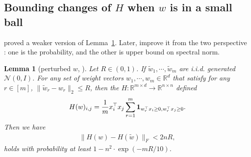 \documentclass[11pt]{article}
\newcommand{\N}{\mathcal{N}}
\newcommand{\wt}{\widetilde}
\newcommand{\R}{\mathbb{R}}
\newtheorem{lemma}[theorem]{Lemma}
\begin{document}
\subsection{Bounding changes of $H$ when $w$ is in a small ball}

\cite{dzps19} proved a weaker version of Lemma~\ref{lem:3.2}. Later, \cite{sy19} improve it from the two perspective : one is the probability, and the other is upper bound on spectral norm.

\begin{lemma}[perturbed $w$, \cite{sy19}]\label{lem:3.2}
Let $R \in (0,1)$. If $\wt{w}_1, \cdots, \wt{w}_m$ are i.i.d. generated ${\N}(0,I)$. For any set of weight vectors $w_1, \cdots, w_m \in \R^d$ that satisfy for any $r\in [m]$, $\| \wt{w}_r - w_r \|_2 \leq R$, then the $H : \R^{m \times d} \rightarrow \R^{n \times n}$ defined
\begin{align*}
    H(w)_{i,j} =  \frac{1}{m} x_i^\top x_j \sum_{r=1}^m {\bf 1}_{ w_r^\top x_i \geq 0, w_r^\top x_j \geq 0 } .
\end{align*}
Then we have
\begin{align*}
\| H (w) - H(\wt{w}) \|_F < 2 n R,
\end{align*}
holds with probability at least $1-n^2 \cdot \exp(-m R /10)$.
\end{lemma}
\end{document}
